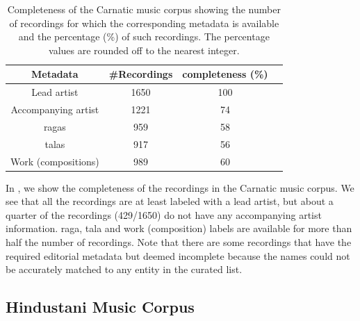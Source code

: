 \begin{table}
	\begin{centering}
		\begin{tabular}{ c c c c}
			\hline
			Metadata	 		&  \#Recordings	& completeness (\%)\\
			\hline
			Lead artist			& 	1650	& 	100	\\						
			Accompanying artist	& 	1221	& 	74	\\
			\Glspl{raga}		& 	959		& 	58	\\
			\Glspl{tala}		& 	917		& 	56	\\
			Work (compositions)		& 	989		& 	60	\\
			
			\hline
			
		\end{tabular}
		\par \end{centering}	
	\caption[Completeness of the Carnatic music corpus]{Completeness of the Carnatic music corpus showing the number of recordings for which the corresponding metadata is available and the percentage (\%) of such recordings. The percentage values are rounded off to the nearest integer.} 
	\label{tab:completeness_carnatic_corpus}
\end{table}


In , we show the completeness of the recordings in the Carnatic music corpus. We see that all the recordings are at least labeled with a lead artist, but about a quarter of the recordings (429/1650) do not have any accompanying artist information. \Gls{raga}, \gls{tala} and work (composition) labels are available for more than half the number of recordings. Note that there are some recordings that have the required editorial metadata but deemed incomplete because the names could not be accurately matched to any entity in the curated list. 


\subsection{Hindustani Music Corpus}
\label{sec:corpus_hindustani_music_corpus}

